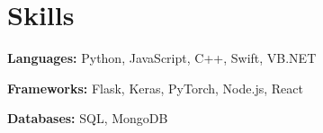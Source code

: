 \section{Skills}
 \resumeSubHeadingListStart
   \item{
     \textbf{Languages: }{Python, JavaScript, C++, Swift, VB.NET}
   } \vspace{-6px}
   \item{
      \textbf{Frameworks: }{Flask, Keras, PyTorch, Node.js, React}
   } \vspace{-6px}
   \item{
      \textbf{Databases: }{SQL, MongoDB}
   }
 \resumeSubHeadingListEnd